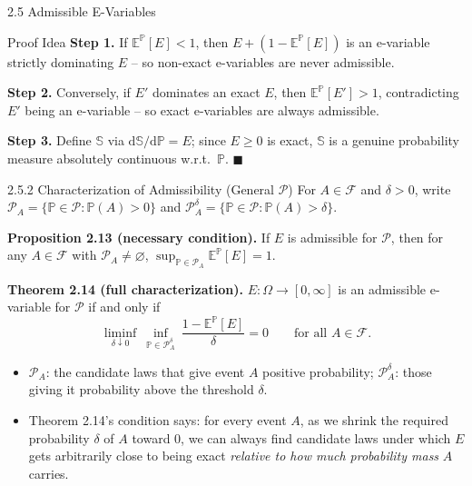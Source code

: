 \documentclass[aspectratio=169,10pt]{beamer}
\newcommand{\PP}{\mathbb{P}}
\newcommand{\EE}{\mathbb{E}}
\newcommand{\calP}{\mathcal{P}}
\newcommand{\calF}{\mathcal{F}}
\begin{document}
\begin{frame}[allowframebreaks]{2.5 Admissible E-Variables}
  \begin{block}{Proof Idea}
    \textbf{Step 1.} If $\EE^\PP[E]<1$, then $E+(1-\EE^\PP[E])$ is an
    e-variable strictly dominating $E$ -- so non-exact e-variables are
    never admissible.

    \medskip
    \textbf{Step 2.} Conversely, if $E'$ dominates an exact $E$, then
    $\EE^\PP[E']>1$, contradicting $E'$ being an e-variable -- so exact
    e-variables are always admissible.

    \medskip
    \textbf{Step 3.} Define $\mathbb{S}$ via
    $\mathrm{d}\mathbb{S}/\mathrm{d}\PP = E$; since $E\ge0$ is exact,
    $\mathbb{S}$ is a genuine probability measure absolutely continuous
    w.r.t.\ $\PP$. $\blacksquare$
  \end{block}

  \framebreak

  \begin{block}{2.5.2 Characterization of Admissibility (General $\calP$)}
    For $A\in\calF$ and $\delta>0$, write $\calP_A = \{\PP\in\calP:\PP(A)>0\}$
    and $\calP_A^\delta = \{\PP\in\calP:\PP(A)>\delta\}$.

    \medskip
    \textbf{Proposition 2.13 (necessary condition).} If $E$ is admissible
    for $\calP$, then for any $A\in\calF$ with $\calP_A\ne\varnothing$,
    $\sup_{\PP\in\calP_A}\EE^\PP[E]=1$.

    \medskip
    \textbf{Theorem 2.14 (full characterization).} $E:\Omega\to[0,\infty]$
    is an admissible e-variable for $\calP$ if and only if
    \[
      \liminf_{\delta\downarrow0}\ \inf_{\PP\in\calP_A^\delta}\
      \frac{1-\EE^\PP[E]}{\delta} = 0 \qquad \text{for all } A\in\calF.
    \]
  \end{block}

  \begin{itemize}
    \item $\calP_A$: the candidate laws that give event $A$ positive
      probability; $\calP_A^\delta$: those giving it probability above the
      threshold $\delta$.
    \item Theorem 2.14's condition says: for every event $A$, as we shrink
      the required probability $\delta$ of $A$ toward 0, we can always find
      candidate laws under which $E$ gets arbitrarily close to being exact
      \emph{relative to how much probability mass} $A$ carries.
  \end{itemize}

  \framebreak


\end{frame}
\end{document}
